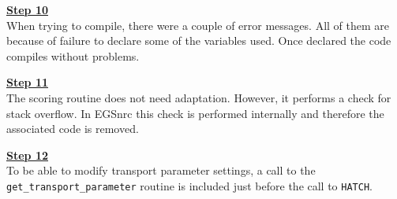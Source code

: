 \noindent
\underline{\bf Step 10} \hfill \\
When trying to compile, there were a couple of error messages.
All of them are because of failure to declare some of the
variables used. Once declared the code compiles without problems.

\noindent
\underline{\bf Step 11} \hfill \\
The scoring routine does not need adaptation.
However, it performs a check for stack overflow.
In EGSnrc this check is performed internally and
therefore the associated code is removed.

\noindent
\underline{\bf Step 12} \hfill \\
To be able to modify transport parameter settings,
a call to the {\tt get\_transport\_parameter}
routine is included just before the call to {\tt HATCH}.

